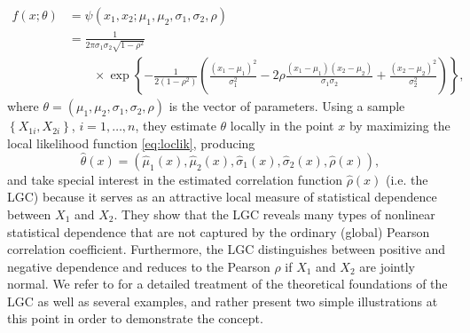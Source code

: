 \begin{align}
f\left(x;\theta\right) 
&= \psi\left(x_1, x_2;\mu_1, \mu_2, \sigma_1, \sigma_2, \rho\right)  \nonumber\\ 
&= \frac{1}{2\pi \sigma_1 \sigma_2\sqrt{1-\rho^2}} \nonumber \\
& \qquad \times\exp \left\{-\frac{1}{2(1-\rho^2)}\left(\frac{\left(x_1-\mu_1\right)^2}{\sigma_1^2}-2\rho\frac{\left(x_1-\mu_1\right)\left(x_2-\mu_2\right)}{\sigma_1 \sigma_2}+\frac{\left(x_2-\mu_2\right)^2}{\sigma_2^2}\right)\right\},
\label{eq:gaussian}
\end{align}
where $\theta = \left(\mu_1,\mu_2,\sigma_1,\sigma_2,\rho\right)$ is the vector of parameters. Using a sample $\left\{X_{1i}, X_{2i}\right\}$, $i = 1, \ldots, n$, they estimate $\theta$ locally in the point $x$ by maximizing the local likelihood function \eqref{eq:loclik}, producing
$$\widehat\theta\left(x\right) = \left(\widehat\mu_1\left(x\right), \widehat\mu_2\left(x\right), \widehat\sigma_1\left(x\right), \widehat\sigma_2\left(x\right), \widehat\rho\left(x\right)\right),$$
and take special interest in the estimated correlation function $\widehat\rho\left(x\right)$ (i.e. the LGC) because it serves as an attractive local measure of statistical dependence between $X_1$ and $X_2$. They show that the LGC reveals many types of nonlinear statistical dependence that are not captured by the ordinary (global) Pearson correlation coefficient. Furthermore, the LGC distinguishes between positive and negative dependence and reduces to the Pearson $\rho$ if $X_1$ and $X_2$ are jointly normal. We refer to \cite{tjos:huft:2013} for a detailed treatment of the theoretical foundations of the LGC as well as several examples, and rather present two simple illustrations at this point in order to demonstrate the concept. 

